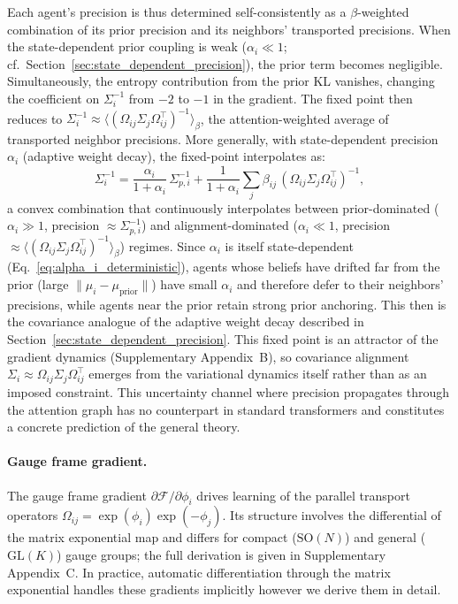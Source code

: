 \documentclass[twoside,11pt]{article}
\begin{document}
Each agent's precision is thus determined self-consistently as a
$\beta$-weighted combination of its prior precision and its neighbors'
transported precisions. When the state-dependent prior coupling is
weak ($\alpha_i \ll 1$; cf.\ Section~\ref{sec:state_dependent_precision}),
the prior term becomes negligible. Simultaneously, the entropy
contribution from the prior KL vanishes, changing the coefficient on
$\Sigma_i^{-1}$ from $-2$ to $-1$ in the gradient. The fixed point then
reduces to
$\Sigma_i^{-1} \approx
\langle(\Omega_{ij}\Sigma_j\Omega_{ij}^\top)^{-1}\rangle_\beta$,
the attention-weighted average of transported neighbor precisions.
More generally, with state-dependent precision $\alpha_i$ (adaptive
weight decay), the fixed-point interpolates as:
%
\begin{equation}
\Sigma_i^{-1}
= \frac{\alpha_i}{1+\alpha_i}\,\Sigma_{p,i}^{-1}
+ \frac{1}{1+\alpha_i}\sum_j \beta_{ij}\,
(\Omega_{ij}\Sigma_j\Omega_{ij}^\top)^{-1},
\label{eq:sigma_fixed_point_alpha}
\end{equation}
%
a convex combination that continuously interpolates between
prior-dominated ($\alpha_i \gg 1$, precision $\approx \Sigma_{p,i}^{-1}$)
and alignment-dominated ($\alpha_i \ll 1$, precision
$\approx \langle(\Omega_{ij}\Sigma_j\Omega_{ij}^\top)^{-1}\rangle_\beta$)
regimes. Since $\alpha_i$ is itself state-dependent
(Eq.~\ref{eq:alpha_i_deterministic}), agents whose beliefs have
drifted far from the prior (large $\|\mu_i - \mu_{\text{prior}}\|$)
have small $\alpha_i$ and therefore defer to their neighbors'
precisions, while agents near the prior retain strong prior anchoring.  This then is the covariance analogue of the adaptive weight decay described in
Section~\ref{sec:state_dependent_precision}.
This fixed point is an attractor of the gradient dynamics
(Supplementary Appendix~B), so covariance alignment
$\Sigma_i \approx \Omega_{ij}\Sigma_j\Omega_{ij}^\top$ emerges from the
variational dynamics itself rather than as an imposed constraint. This
uncertainty channel where precision propagates through the attention
graph has no counterpart in standard transformers and constitutes a
concrete prediction of the general theory.

\paragraph{Gauge frame gradient.}
The gauge frame gradient $\partial \mathcal{F}/\partial \phi_i$ drives learning of the parallel transport operators $\Omega_{ij} = \exp(\phi_i)\exp(-\phi_j)$. Its structure involves the differential of the matrix exponential map and differs for compact ($\mathrm{SO}(N)$) and general ($\mathrm{GL}(K)$) gauge groups; the full derivation is given in Supplementary Appendix~C. In practice, automatic differentiation through the matrix exponential handles these gradients implicitly however we derive them in detail.
\end{document}

